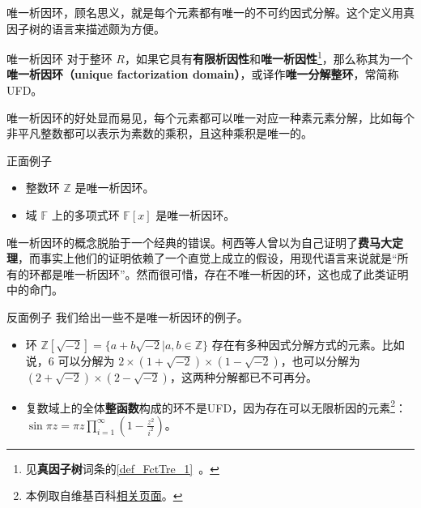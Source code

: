 


唯一析因环，顾名思义，就是每个元素都有唯一的不可约因式分解。这个定义用真因子树的语言来描述颇为方便。

\begin{definition}{唯一析因环}
对于整环 $R$，如果它具有\textbf{有限析因性}和\textbf{唯一析因性}\footnote{见\textbf{真因子树}词条的\autoref{def_FctTre_1}~。}，那么称其为一个\textbf{唯一析因环（unique factorization domain）}，或译作\textbf{唯一分解整环}，常简称UFD。
\end{definition}


唯一析因环的好处显而易见，每个元素都可以唯一对应一种素元素分解，比如每个非平凡整数都可以表示为素数的乘积，且这种乘积是唯一的。

\begin{example}{正面例子}
\begin{itemize}
\item 整数环 $\mathbb{Z}$ 是唯一析因环。
\item 域 $\mathbb{F}$ 上的多项式环 $\mathbb{F}[x]$ 是唯一析因环。
\end{itemize}
\end{example}

唯一析因环的概念脱胎于一个经典的错误。柯西等人曾以为自己证明了\textbf{费马大定理}，而事实上他们的证明依赖了一个直觉上成立的假设，用现代语言来说就是“所有的环都是唯一析因环”。然而很可惜，存在不唯一析因的环，这也成了此类证明中的命门。

\begin{example}{反面例子}
我们给出一些不是唯一析因环的例子。
\begin{itemize}
\item 环 $\mathbb{Z}[\sqrt{-2}]=\{a+b\sqrt{-2}|a, b\in\mathbb{Z}\}$ 存在有多种因式分解方式的元素。比如说，$6$ 可以分解为 $2\times (1+\sqrt{-2})\times(1-\sqrt{-2})$，也可以分解为 $(2+\sqrt{-2})\times(2-\sqrt{-2})$，这两种分解都已不可再分。
\item 复数域上的全体\textbf{整函数}构成的环不是UFD，因为存在可以无限析因的元素\footnote{本例取自维基百科\href{https://en.wikipedia.org/wiki/Unique_factorization_domain}{相关页面}。}：$\sin{\pi z=\pi z\prod\limits_{i=1}^\infty(1-\frac{z^2}{i^2})}$。
\end{itemize}
\end{example}

